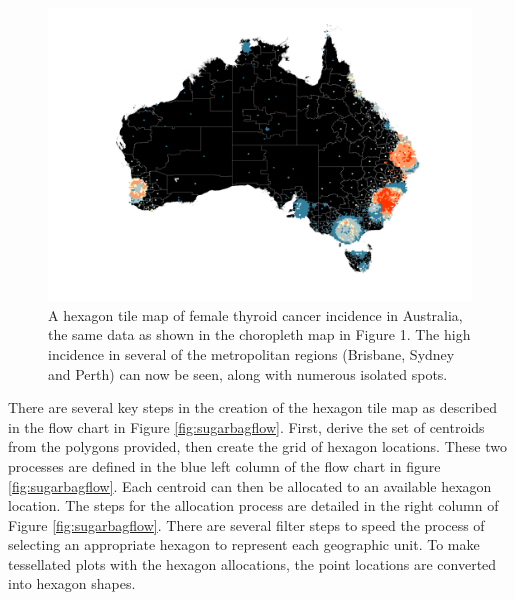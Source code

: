 \begin{figure}
\includegraphics[width=0.95\linewidth]{kobakian-cook_files/figure-latex/hexmap-1} \caption{A hexagon tile map of female thyroid cancer incidence in Australia, the same data as shown in the choropleth map in Figure 1. The high incidence in several of the metropolitan regions (Brisbane, Sydney and Perth) can now be seen, along with numerous isolated spots.}\label{fig:hexmap}
\end{figure}

There are several key steps in the creation of the hexagon tile map as described in the flow chart in Figure \ref{fig:sugarbagflow}. First, derive the set of centroids from the polygons provided, then create the grid of hexagon locations. These two processes are defined in the blue left column of the flow chart in figure \ref{fig:sugarbagflow}. Each centroid can then be allocated to an available hexagon location. The steps for the allocation process are detailed in the right column of Figure \ref{fig:sugarbagflow}. There are several filter steps to speed the process of selecting an appropriate hexagon to represent each geographic unit. To make tessellated plots with the hexagon allocations, the point locations are converted into hexagon shapes.

